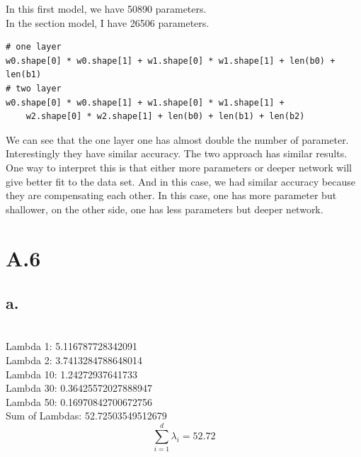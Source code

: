 \documentclass{article}
\begin{document}
In this first model, we have 50890 parameters. \\
In the section model, I have 26506 parameters. \\

\begin{verbatim}
# one layer
w0.shape[0] * w0.shape[1] + w1.shape[0] * w1.shape[1] + len(b0) + len(b1)
# two layer
w0.shape[0] * w0.shape[1] + w1.shape[0] * w1.shape[1] + 
	w2.shape[0] * w2.shape[1] + len(b0) + len(b1) + len(b2)

\end{verbatim}

We can see that the one layer one has almost double the number of parameter. Interestingly they have similar accuracy. The two approach has similar results. One way to interpret this is that either more parameters or deeper network will give better fit to the data set. And in this case, we had similar accuracy because they are compensating each other. In this case, one has more parameter but shallower, on the other side, one has less parameters but deeper network. 


\section*{A.6}

\subsection*{a.}

 \\
Lambda 1:  5.116787728342091 \\
Lambda 2:  3.7413284788648014 \\
Lambda 10:  1.24272937641733 \\
Lambda 30:  0.36425572027888947 \\
Lambda 50:  0.16970842700672756 \\
Sum of Lambdas:  52.72503549512679 \\
\[ \sum_{i=1}^{d} \lambda_i =52.72 \]
\end{document}
